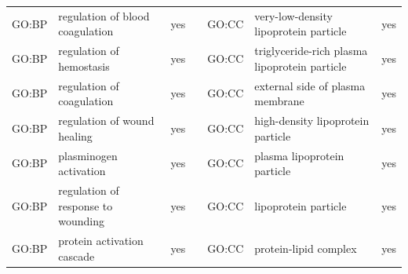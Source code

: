 \begin{longtable}{@{}lp{5cm}lllp{5cm}l@{}}
GO:BP           & regulation of blood coagulation                                                                                                    & yes              &           & GO:CC           & very-low-density lipoprotein particle                                                                                                                                  & yes              \\
GO:BP           & regulation of hemostasis                                                                                                           & yes              &           & GO:CC           & triglyceride-rich plasma lipoprotein particle                                                                                                                          & yes              \\
GO:BP           & regulation of coagulation                                                                                                          & yes              &           & GO:CC           & external side of plasma membrane                                                                                                                                       & yes              \\
GO:BP           & regulation of wound healing                                                                                                        & yes              &           & GO:CC           & high-density lipoprotein particle                                                                                                                                      & yes              \\
GO:BP           & plasminogen activation                                                                                                             & yes              &           & GO:CC           & plasma lipoprotein particle                                                                                                                                            & yes              \\
GO:BP           & regulation of response to wounding                                                                                                 & yes              &           & GO:CC           & lipoprotein particle                                                                                                                                                   & yes              \\
GO:BP           & protein activation cascade                                                                                                         & yes              &           & GO:CC           & protein-lipid complex                                                                                                                                                  & yes              \\

\end{longtable}

